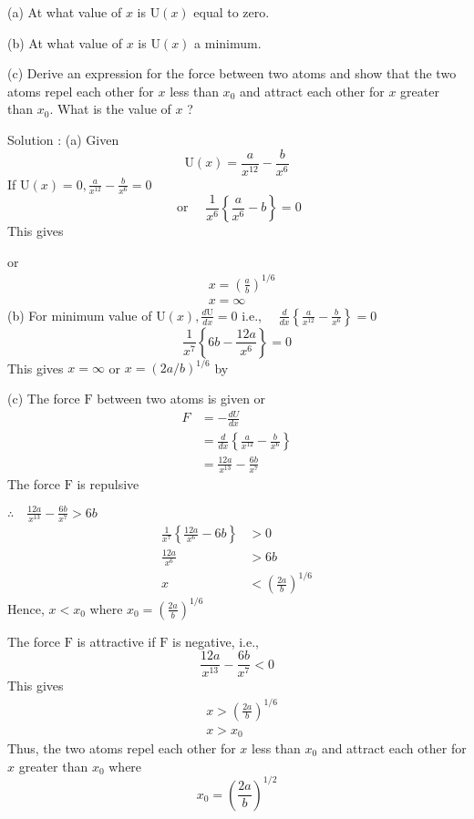 \begin{enumerate}
(a) At what value of $x$ is $\mathrm{U}(x)$ equal to zero.

(b) At what value of $x$ is $\mathrm{U}(x)$ a minimum.

(c) Derive an expression for the force between two atoms and show that the two atoms repel each other for $x$ less than $x_{0}$ and attract each other for $x$ greater than $x_{0}$. What is the value of $x$ ?

Solution : (a) Given
$$
\mathrm{U}(x)=\frac{a}{x^{12}}-\frac{b}{x^{6}}
$$
If $\mathrm{U}(x)=0, \frac{a}{x^{12}}-\frac{b}{x^{6}}=0$
$$
\text { or } \quad \frac{1}{x^{6}}\left\{\frac{a}{x^{6}}-b\right\}=0
$$
This gives

or
$$
\begin{aligned}
&x=\left(\frac{a}{b}\right)^{1 / 6} \\
&x=\infty
\end{aligned}
$$
(b) For minimum value of $\mathrm{U}(x), \frac{d \mathrm{U}}{d x}=0$ i.e., $\quad \frac{d}{d x}\left\{\frac{a}{x^{12}}-\frac{b}{x^{6}}\right\}=0$
$$
\frac{1}{x^{7}}\left\{6 b-\frac{12 a}{x^{6}}\right\}=0
$$
This gives $x=\infty$ or $x=(2 a / b)^{1 / 6}$ by

(c) The force $\mathrm{F}$ between two atoms is given or
$$
\begin{aligned}
F &=-\frac{d U}{d x} \\
&=\frac{d}{d x}\left\{\frac{a}{x^{12}}-\frac{b}{x^{6}}\right\} \\
&=\frac{12 a}{x^{13}}-\frac{6 b}{x^{7}}
\end{aligned}
$$
The force $\mathrm{F}$ is repulsive

$\therefore \quad \frac{12 a}{x^{13}}-\frac{6 b}{x^{7}}>6 b$
$$
\begin{aligned}
\frac{1}{x^{7}}\left\{\frac{12 a}{x^{6}}-6 b\right\} &>0 \\
\frac{12 a}{x^{6}} &>6 b \\
x &<\left(\frac{2 a}{b}\right)^{1 / 6}
\end{aligned}
$$
Hence, $x<x_{0}$ where $x_{0}=\left(\frac{2 a}{b}\right)^{1 / 6}$

The force $\mathrm{F}$ is attractive if $\mathrm{F}$ is negative, i.e.,
$$
\frac{12 a}{x^{13}}-\frac{6 b}{x^{7}}<0
$$
This gives
$$
\begin{aligned}
&x>\left(\frac{2 a}{b}\right)^{1 / 6} \\
&x>x_{0}
\end{aligned}
$$
Thus, the two atoms repel each other for $x$ less than $x_{0}$ and attract each other for $x$ greater than $x_{0}$ where
$$
x_{0}=\left(\frac{2 a}{b}\right)^{1 / 2}
$$
\end{enumerate}